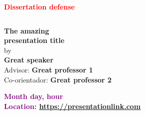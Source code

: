 \documentclass{beamer}
\begin{document}


\begin{frame}

\begin{center}
{\huge \textcolor{red}{\textbf{Dissertation defense}}} \\
\end{center}
\vspace{3mm}

\begin{columns}
\begin{column}{0.65\linewidth}
\begin{center}

\textbf{The amazing \\ 
presentation title} \\
\vspace{2mm} 
by\\ 
\textbf{Great speaker} \\
\vspace{2mm}
Advisor: \textbf{Great professor 1} ~~~~~~~~~\\
Co-orientador: \textbf{Great professor 2}  \\
\vspace{5mm}

\textcolor{purple}{\textbf{Month day, hour}} \\
\textcolor{purple}{\textbf{Location: {\scriptsize \url{https://presentationlink.com}}}}

\end{center}
\end{column}
%
\begin{column}{0.35\linewidth}
\begin{center}

\vspace{10mm}
\end{center}
\end{column}

\end{columns} 

\end{frame}


\end{document}
